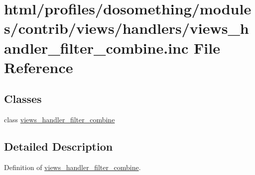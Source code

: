 \hypertarget{views__handler__filter__combine_8inc}{
\section{html/profiles/dosomething/modules/contrib/views/handlers/views\_\-handler\_\-filter\_\-combine.inc File Reference}
\label{views__handler__filter__combine_8inc}
}
\subsection*{Classes}
\begin{DoxyCompactItemize}
\item 
class \hyperlink{classviews__handler__filter__combine}{views\_\-handler\_\-filter\_\-combine}
\end{DoxyCompactItemize}


\subsection{Detailed Description}
Definition of \hyperlink{classviews__handler__filter__combine}{views\_\-handler\_\-filter\_\-combine}. 